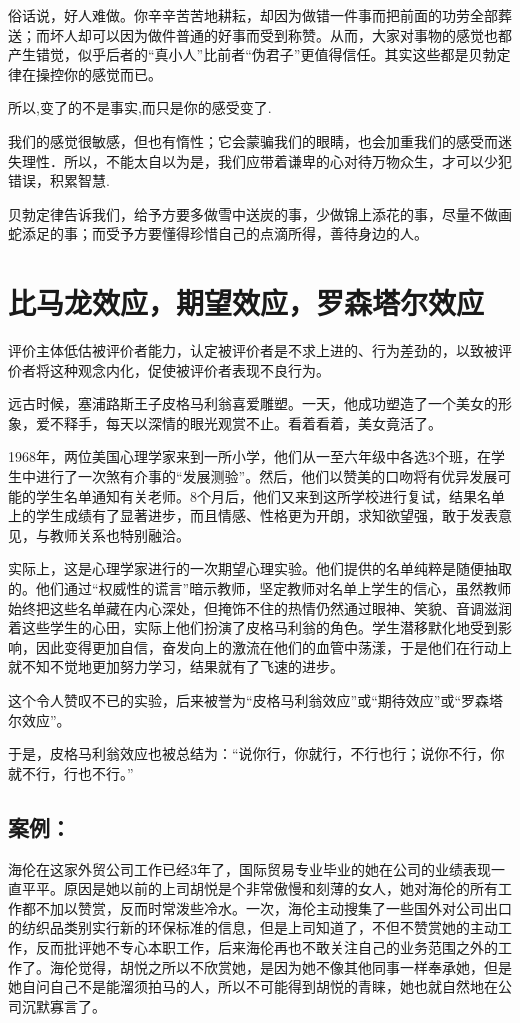 \documentclass[11pt]{ctexart}
\begin{document}
俗话说，好人难做。你辛辛苦苦地耕耘，却因为做错一件事而把前面的功劳全部葬送；而坏人却可以因为做件普通的好事而受到称赞。从而，大家对事物的感觉也都产生错觉，似乎后者的“真小人”比前者“伪君子”更值得信任。其实这些都是贝勃定律在操控你的感觉而已。

所以,变了的不是事实,而只是你的感受变了.

我们的感觉很敏感，但也有惰性；它会蒙骗我们的眼睛，也会加重我们的感受而迷失理性．所以，不能太自以为是，我们应带着谦卑的心对待万物众生，才可以少犯错误，积累智慧.

贝勃定律告诉我们，给予方要多做雪中送炭的事，少做锦上添花的事，尽量不做画蛇添足的事；而受予方要懂得珍惜自己的点滴所得，善待身边的人。
\section{比马龙效应，期望效应，罗森塔尔效应}
\label{sec-11}


评价主体低估被评价者能力，认定被评价者是不求上进的、行为差劲的，以致被评价者将这种观念内化，促使被评价者表现不良行为。

远古时候，塞浦路斯王子皮格马利翁喜爱雕塑。一天，他成功塑造了一个美女的形象，爱不释手，每天以深情的眼光观赏不止。看着看着，美女竟活了。

1968年，两位美国心理学家来到一所小学，他们从一至六年级中各选3个班，在学生中进行了一次煞有介事的“发展测验”。然后，他们以赞美的口吻将有优异发展可能的学生名单通知有关老师。8个月后，他们又来到这所学校进行复试，结果名单上的学生成绩有了显著进步，而且情感、性格更为开朗，求知欲望强，敢于发表意见，与教师关系也特别融洽。

实际上，这是心理学家进行的一次期望心理实验。他们提供的名单纯粹是随便抽取的。他们通过“权威性的谎言”暗示教师，坚定教师对名单上学生的信心，虽然教师始终把这些名单藏在内心深处，但掩饰不住的热情仍然通过眼神、笑貌、音调滋润着这些学生的心田，实际上他们扮演了皮格马利翁的角色。学生潜移默化地受到影响，因此变得更加自信，奋发向上的激流在他们的血管中荡漾，于是他们在行动上就不知不觉地更加努力学习，结果就有了飞速的进步。

这个令人赞叹不已的实验，后来被誉为“皮格马利翁效应”或“期待效应”或“罗森塔尔效应”。

于是，皮格马利翁效应也被总结为：“说你行，你就行，不行也行；说你不行，你就不行，行也不行。”
\subsection{案例：}
\label{sec-11-1}


海伦在这家外贸公司工作已经3年了，国际贸易专业毕业的她在公司的业绩表现一直平平。原因是她以前的上司胡悦是个非常傲慢和刻薄的女人，她对海伦的所有工作都不加以赞赏，反而时常泼些冷水。一次，海伦主动搜集了一些国外对公司出口的纺织品类别实行新的环保标准的信息，但是上司知道了，不但不赞赏她的主动工作，反而批评她不专心本职工作，后来海伦再也不敢关注自己的业务范围之外的工作了。海伦觉得，胡悦之所以不欣赏她，是因为她不像其他同事一样奉承她，但是她自问自己不是能溜须拍马的人，所以不可能得到胡悦的青睐，她也就自然地在公司沉默寡言了。
\end{document}
